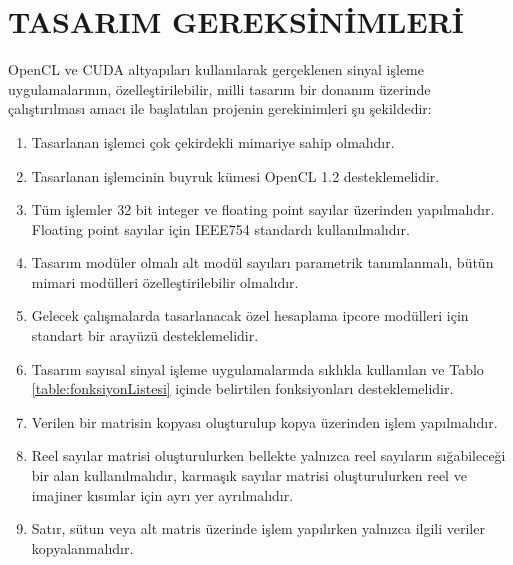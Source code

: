 \chapter{TASARIM GEREKSİNİMLERİ}
OpenCL ve CUDA altyapıları kullanılarak gerçeklenen sinyal işleme uygulamalarının, özelleştirilebilir, milli tasarım bir donanım üzerinde çalıştırılması amacı ile başlatılan projenin gerekinimleri şu şekildedir: 
\begin{enumerate}
  \item Tasarlanan işlemci çok çekirdekli mimariye sahip olmalıdır.
  \item Tasarlanan işlemcinin buyruk kümesi OpenCL 1.2 desteklemelidir. 
  \item Tüm işlemler 32 bit integer ve floating point sayılar üzerinden yapılmalıdır. Floating point sayılar için IEEE754 standardı kullanılmalıdır.
  \item Tasarım modüler olmalı alt modül sayıları parametrik tanımlanmalı, bütün mimari modülleri özelleştirilebilir olmalıdır. 
  \item Gelecek çalışmalarda tasarlanacak özel hesaplama ipcore modülleri için standart bir arayüzü desteklemelidir.
  \item Tasarım sayısal sinyal işleme uygulamalarında sıklıkla kullanılan ve Tablo \ref{table:fonksiyonListesi} içinde belirtilen fonksiyonları desteklemelidir.
  \item Verilen bir matrisin kopyası oluşturulup kopya üzerinden işlem yapılmalıdır.
  \item Reel sayılar matrisi oluşturulurken bellekte yalnızca reel sayıların sığabileceği bir alan kullanılmalıdır, karmaşık sayılar matrisi oluşturulurken reel ve imajiner kısımlar için ayrı yer ayrılmalıdır.
  \item Satır, sütun veya alt matris üzerinde işlem yapılırken yalnızca ilgili veriler kopyalanmalıdır.
  \newpage
  	
  
\end{enumerate}

